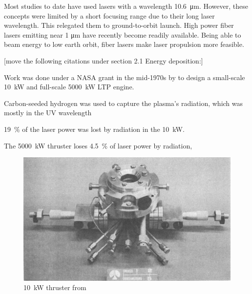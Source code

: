     Most studies to date have used  lasers with a wavelength \qty{10.6}{μm}. However, these concepts were limited by a short focusing range due to their long laser wavelength. This relegated them to ground-to-orbit launch. High power fiber lasers emitting near 1 μm have recently become readily available. Being able to beam energy to low earth orbit, fiber lasers make laser propulsion more feasible.

    [move the following citations under section 2.1 Energy deposition:]
    

        Work was done under a NASA grant in the mid-1970s by \textcite{shojiLaserheatedRocketThruster1977,shojiPerformanceHeatTransfer1976a} to design a small-scale \qty{10}{kW} and full-scale \qty{5000}{kW} LTP engine. 
        
        Carbon-seeded hydrogen was used to capture the plasma's radiation, which was mostly in the UV wavelength 
        
        
        
        \qty{19}{\%} of the laser power was lost by radiation in the \qty{10}{kW}. 
        
        The \qty{5000}{kW} thruster loses \qty{4.5}{\%} of laser power by radiation, 



        \begin{figure}[h]
            \centering
            \includegraphics[width=\textwidth]{assets/2 background/Shoji_assy.png}
            \caption{\qty{10}{kW} thruster from \textcite{shojiPerformanceHeatTransfer1976a}}
            \label{fig:Shoji apparatus}
        \end{figure}


